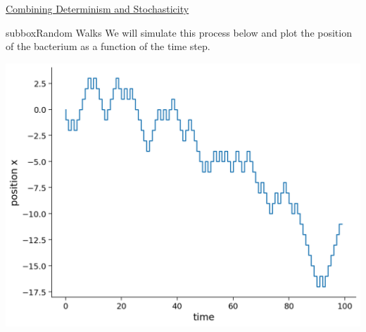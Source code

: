 \begin{textbox}{\href{https://compneuro.neuromatch.io/tutorials/W2D2_LinearSystems/student/W2D2_Tutorial3.html}{Combining Determinism and Stochasticity } }
\begin{subbox}{subbox}{Random Walks}
We will simulate this process below and plot the position of the bacterium as a function of the time step.
\begin{center}
\includegraphics[scale=0.25]{Figures/LS/CDS_Figure1.png}
\end{center}
\end{subbox}
\end{textbox}
